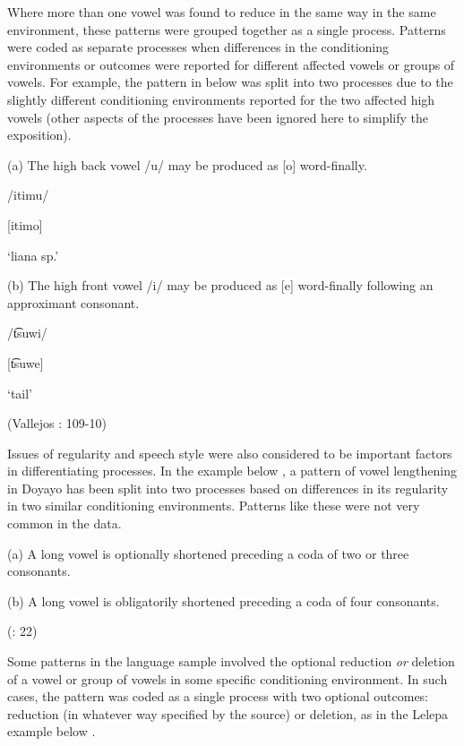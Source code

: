   Where more than one vowel was found to reduce in the same way in the same environment, these patterns were grouped together as a single process. Patterns were coded as separate processes when differences in the conditioning environments or outcomes were reported for different affected vowels or groups of vowels. For example, the pattern in  below was split into two processes due to the slightly different conditioning environments reported for the two affected high vowels (other aspects of the processes have been ignored here to simplify the exposition).

\ea\label{ex:(6.11)}

(a)  The high back vowel /u/ may be produced as [o] word-finally.

/itimu/

[itimo]

\glt ‘liana sp.’

(b)   The high front vowel /i/ may be produced as [e] word-finally following an approximant consonant.

/t͡suwi/

[t͡suwe]

\glt ‘tail’

(Vallejos \citealt{Yopán2010}: 109-10)
\z

  Issues of regularity and speech style were also considered to be important factors in differentiating processes. In the example below , a pattern of vowel lengthening in Doyayo has been split into two processes based on differences in its regularity in two similar conditioning environments. Patterns like these were not very common in the data.

\ea\label{ex:(6.12)}

(a)  A long vowel is optionally shortened preceding a coda of two or three consonants.

(b)   A long vowel is obligatorily shortened preceding a coda of four consonants.

(\citealt{WieringWiering1994}: 22)
\z

  Some patterns in the language sample involved the optional reduction \textit{or} deletion of a vowel or group of vowels in some specific conditioning environment. In such cases, the pattern was coded as a single process with two optional outcomes: reduction (in whatever way specified by the source) or deletion, as in the Lelepa example below .

